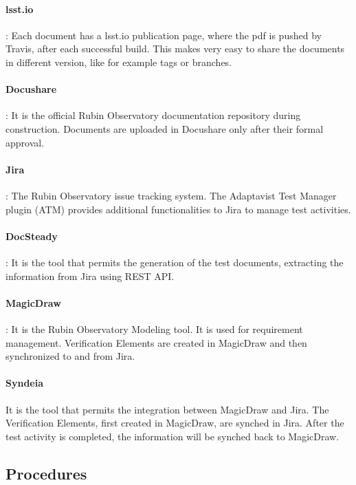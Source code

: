 \paragraph{lsst.io}:
Each document has a lsst.io publication page, where the pdf is pushed by Travis, after each successful build.
This makes very easy to share the documents in different version, like for example tags or branches.

\paragraph{Docushare}:
It is the official Rubin Observatory documentation repository during construction.
Documents are uploaded in Docushare only after their formal approval.

\paragraph{Jira}:
The Rubin Observatory issue tracking system.
The Adaptavist Test Manager plugin (ATM) provides additional functionalities to Jira to manage test activities.

\paragraph{DocSteady}:
It is the tool that permits the generation of the test documents, extracting the information from Jira using REST API.

\paragraph{MagicDraw}:
It is the Rubin Observatory Modeling tool. It is used for requirement management. Verification Elements are created
in MagicDraw and then synchronized to and from Jira.

\paragraph{Syndeia}
It is the tool that permits the integration between MagicDraw and Jira. The Verification Elements, first created in MagicDraw,
are synched in Jira. After the test activity is completed, the information will be synched back to MagicDraw.


\subsection{Procedures}

